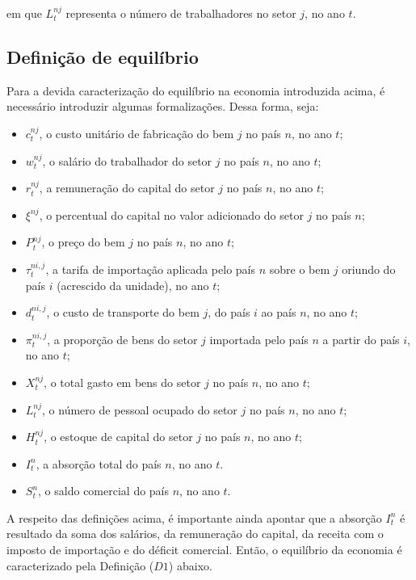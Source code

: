 \documentclass{article}
\begin{document}
em que $L_t^{nj}$ representa o número de trabalhadores no setor $j$, no ano $t$.

\subsection{Definição de equilíbrio}

Para a devida caracterização do equilíbrio na economia introduzida acima, é necessário introduzir algumas formalizações. Dessa forma, seja:

\begin{itemize}
    \item $c_t^{nj}$, o custo unitário de fabricação do bem $j$ no país $n$, no ano $t$;
	\item $w_t^{nj}$, o salário do trabalhador do setor $j$ no país $n$, no ano $t$;
	\item $r_t^{nj}$, a remuneração do capital do setor $j$ no país $n$, no ano $t$;
	\item $\xi^{nj}$, o percentual do capital no valor adicionado do setor $j$ no país $n$;
	\item $P_t^{nj}$, o preço do bem $j$ no país $n$, no ano $t$;
	\item $\tau_t^{ni,j}$, a tarifa de importação aplicada pelo país $n$ sobre o bem $j$ oriundo do país $i$ (acrescido da unidade), no ano $t$;
	\item $d_t^{ni,j}$, o custo de transporte do bem $j$, do país $i$ ao país $n$, no ano $t$;
	\item $\pi_t^{ni,j}$, a proporção de bens do setor $j$ importada pelo país $n$ a partir do país $i$, no ano $t$;
	\item $X_t^{nj}$, o total gasto em bens do setor $j$ no país $n$, no ano $t$;
	\item $L_t^{nj}$, o número de pessoal ocupado do setor $j$ no país $n$, no ano $t$;
	\item $H_t^{nj}$, o estoque de capital do setor $j$ no país $n$, no ano $t$;
	\item $I_t^n$, a absorção total do país $n$, no ano $t$.
	\item $S_t^n$, o saldo comercial do país $n$, no ano $t$.
\end{itemize}


A respeito das definições acima, é importante ainda apontar que a absorção $I_t^n$ é resultado da soma dos salários, da remuneração do capital, da receita com o imposto de importação e do déficit comercial. Então, o equilíbrio da economia é caracterizado pela Definição ($D1$) abaixo.
\end{document}
